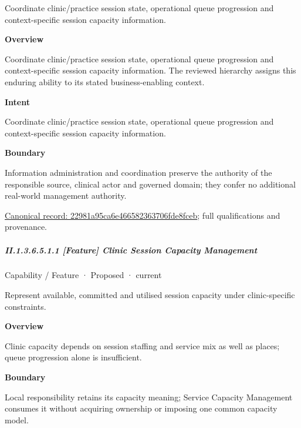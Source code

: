 Coordinate clinic/practice session state, operational queue progression and context-specific session capacity information.



\textbf{Overview}



Coordinate clinic/practice session state, operational queue progression and context-specific session capacity information. The reviewed hierarchy assigns this enduring ability to its stated business-enabling context.



\textbf{Intent}



Coordinate clinic/practice session state, operational queue progression and context-specific session capacity information.



\textbf{Boundary}



Information administration and coordination preserve the authority of the responsible source, clinical actor and governed domain; they confer no additional real-world management authority.


{\footnotesize \href{../../../../../../../continuum/strategy/capability/22981a95ca6e466582363706fde8fceb.md}{Canonical record: 22981a95ca6e466582363706fde8fceb}; full qualifications and provenance.}\par
\subparagraph*{II.1.3.6.5.1.1 [Feature] Clinic Session Capacity Management}
\label{navigation:II.1.3.6.5.1.1}

\label{element:02bdd6a6f22e47f5a29d722ab57f9915}
{\small Capability / Feature · Proposed · current}\par

Represent available, committed and utilised session capacity under clinic-specific constraints.



\textbf{Overview}



Clinic capacity depends on session staffing and service mix as well as places; queue progression alone is insufficient.



\textbf{Boundary}



Local responsibility retains its capacity meaning; Service Capacity Management consumes it without acquiring ownership or imposing one common capacity model.


